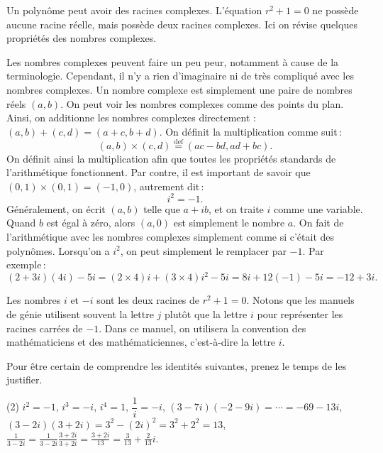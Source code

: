 Un polynôme peut avoir des racines complexes. L'équation  $r^2 + 1 = 0$ ne possède aucune racine réelle, mais possède deux racines complexes. 
Ici on révise quelques propriétés des nombres complexes.

Les nombres complexes peuvent faire un peu peur, notamment à cause de la terminologie. Cependant, il n'y a rien d'imaginaire ni de très compliqué avec les nombres complexes. 
Un nombre complexe est simplement une paire de nombres réels $(a,b)$.  
On peut voir les nombres complexes comme des points du plan. Ainsi, on additionne les nombres complexes directement :  $(a,b)+(c,d)=(a+c,b+d)$.  On définit la multiplication  comme suit\,: 
\begin{equation*}
(a,b) \times (c,d) \overset{\text{def}}{=} (ac-bd,ad+bc) .
\end{equation*}
On définit ainsi la multiplication afin que toutes les propriétés standards de l'arithmétique fonctionnent. Par contre, il est important de savoir que  $(0,1) \times (0,1) = (-1,0)$, autrement dit\,:
 \begin{equation*}
i^2=-1.
\end{equation*}
Généralement, on écrit  $(a,b)$ telle que $a+ib$, et on traite $i$ comme une variable.  Quand $b$ est égal à zéro, alors $(a,0)$ est simplement le nombre $a$.
On fait de l'arithmétique avec les nombres complexes simplement comme si c'était des polynômes. 
Lorsqu'on a $i^2$, on peut simplement le remplacer par  $-1$.
Par exemple\,: 
\begin{equation*}
(2+3i)(4i) - 5i = 
(2\times 4)i + (3 \times 4) i^2 - 5i
=
8i + 12 (-1) - 5i
=
-12 + 3i .
\end{equation*}

Les nombres
$i$ et $-i$ sont les deux racines de $r^2 + 1 = 0$.
Notons que les manuels de génie utilisent souvent la lettre $j$ plutôt que la lettre $i$ pour représenter les racines carrées de $-1$. Dans ce manuel, on utilisera la convention des mathématiciens et des mathématiciennes, c'est-à-dire la lettre  $i$.

\begin{exercise}
Pour être certain de comprendre les identités suivantes, prenez le temps de les justifier. 
\begin{tasks}(2)
\task $i^2 = -1$, $i^3 = -i$, $i^4 = 1$,
\task $\dfrac{1}{i} = -i$,
\task $(3-7i)(-2-9i) = \cdots = -69-13i$,
\task $(3-2i)(3+2i) = 3^2 - {(2i)}^2 = 3^2 + 2^2 = 13$,
\task $\frac{1}{3-2i} = \frac{1}{3-2i} \frac{3+2i}{3+2i} = \frac{3+2i}{13}
= \frac{3}{13}+\frac{2}{13}i$.
\end{tasks}
\end{exercise}

